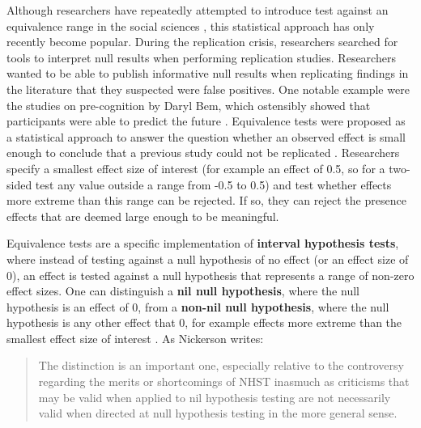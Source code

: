 \documentclass[
  oneside]{book}
\begin{document}
Although researchers have repeatedly attempted to introduce test against an equivalence range in the social sciences \citep{cribbie_recommendations_2004, levine_communication_2008, hoenig_abuse_2001, rogers_using_1993, quertemont_how_2011}, this statistical approach has only recently become popular. During the replication crisis, researchers searched for tools to interpret null results when performing replication studies. Researchers wanted to be able to publish informative null results when replicating findings in the literature that they suspected were false positives. One notable example were the studies on pre-cognition by Daryl Bem, which ostensibly showed that participants were able to predict the future \citep{bem_feeling_2011}. Equivalence tests were proposed as a statistical approach to answer the question whether an observed effect is small enough to conclude that a previous study could not be replicated \citep{anderson_theres_2016, lakens_equivalence_2017, simonsohn_small_2015}. Researchers specify a smallest effect size of interest (for example an effect of 0.5, so for a two-sided test any value outside a range from -0.5 to 0.5) and test whether effects more extreme than this range can be rejected. If so, they can reject the presence effects that are deemed large enough to be meaningful.

Equivalence tests are a specific implementation of \textbf{interval hypothesis tests}, where instead of testing against a null hypothesis of no effect (or an effect size of 0), an effect is tested against a null hypothesis that represents a range of non-zero effect sizes. One can distinguish a \textbf{nil null hypothesis}, where the null hypothesis is an effect of 0, from a \textbf{non-nil null hypothesis}, where the null hypothesis is any other effect that 0, for example effects more extreme than the smallest effect size of interest \citep{nickerson_null_2000}. As Nickerson writes:

\begin{quote}
The distinction is an important one, especially relative to the controversy regarding the merits or shortcomings of NHST inasmuch as criticisms that may be valid when applied to nil hypothesis testing are not necessarily valid when directed at null hypothesis testing in the more general sense.
\end{quote}
\end{document}
